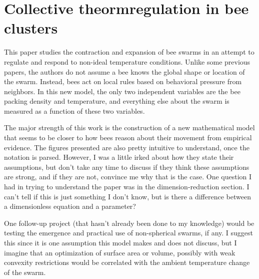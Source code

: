 \documentclass[12pt]{article}
\begin{document}
\section*{Collective theormregulation in bee clusters}
This paper studies the contraction and expansion of bee swarms in an attempt to regulate and respond to non-ideal temperature conditions.
Unlike some previous papers, the authors do not assume a bee knows the global shape or location of the swarm.
Instead, bees act on local rules based on behavioral pressure from neighbors.
In this new model, the only two independent variables are the bee packing density and temperature, and everything else about the swarm is measured as a function of these two variables.


The major strength of this work is the construction of a new mathematical model that seems to be closer to how bees reason about their movement from empirical evidence.
The figures presented are also pretty intuitive to understand, once the notation is parsed.
However, I was a little irked about how they state their assumptions, but don't take any time to discuss if they think these assumptions are strong, and if they are not, convince me why that is the case.
One question I had in trying to understand the paper was in the dimension-reduction section.
I can't tell if this is just something I don't know, but is there a difference between a dimensionless equation and a parameter?

One follow-up project (that hasn't already been done to my knowledge) would be testing the emergence and practical use of non-spherical swarms, if any.
I suggest this since it is one assumption this model makes and does not discuss, but I imagine that an optimization of surface area or volume, possibly with weak convexity restrictions would be correlated with the ambient temperature change of the swarm.



\end{document}
